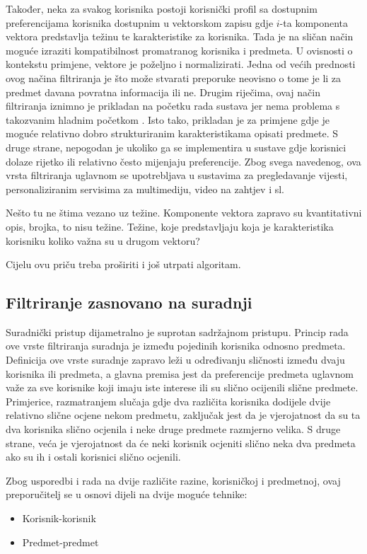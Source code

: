 \documentclass[times, utf8, diplomski, numeric]{fer}
\begin{document}
Također, neka za svakog korisnika postoji korisnički profil sa dostupnim
preferencijama korisnika dostupnim u vektorskom zapisu gdje $i$-ta komponenta
vektora predstavlja težinu te karakteristike za korisnika. Tada je na sličan
način moguće izraziti kompatibilnost promatranog korisnika i predmeta. U
ovisnosti o kontekstu primjene, vektore je poželjno i normalizirati.
Jedna od većih prednosti ovog načina filtriranja je što može stvarati preporuke
neovisno o tome je li za predmet davana povratna informacija ili ne. Drugim
riječima, ovaj način filtriranja iznimno je prikladan na početku rada sustava
jer nema problema s takozvanim hladnim početkom . Isto
tako, prikladan je za primjene gdje je moguće relativno dobro strukturiranim
karakteristikama opisati predmete. S druge strane, nepogodan je ukoliko ga
se implementira u sustave gdje korisnici dolaze rijetko ili relativno često
mijenjaju preferencije. Zbog svega navedenog, ova vrsta filtriranja uglavnom se
upotrebljava u sustavima za pregledavanje vijesti, personaliziranim servisima za
multimediju, video na zahtjev i sl.

Nešto tu ne štima vezano uz težine. Komponente vektora zapravo su kvantitativni
opis, brojka, to nisu težine. Težine, koje predstavljaju koja je karakteristika
korisniku koliko važna su u drugom vektoru?

Cijelu ovu priču treba proširiti i još utrpati algoritam.

\subsection{Filtriranje zasnovano na suradnji}
Suradnički pristup dijametralno je suprotan sadržajnom pristupu. Princip rada
ove vrste filtriranja suradnja je između pojedinih korisnika odnosno predmeta.
Definicija ove vrste suradnje zapravo leži u određivanju sličnosti između dvaju
korisnika ili predmeta, a glavna premisa jest da preferencije predmeta uglavnom
važe za sve korisnike koji imaju iste interese ili su slično ocijenili slične
predmete. Primjerice, razmatranjem slučaja gdje dva različita korisnika dodijele
dvije relativno slične ocjene nekom predmetu, zaključak jest da je vjerojatnost
da su ta dva korisnika slično ocjenila i neke druge predmete razmjerno velika. S
druge strane, veća je vjerojatnost da će neki korisnik ocjeniti slično neka dva
predmeta ako su ih i ostali korisnici slično ocjenili.

Zbog usporedbi i rada na dvije različite razine, korisničkoj i predmetnoj, ovaj
preporučitelj se u osnovi dijeli na dvije moguće tehnike:
\begin{itemize}
  \item Korisnik-korisnik 
  \item Predmet-predmet 
\end{itemize}
\end{document}

